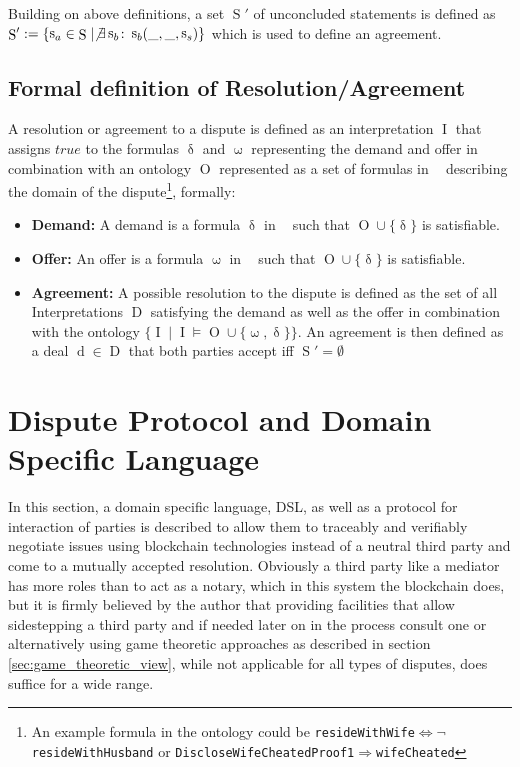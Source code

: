 \documentclass[12pt,msc,a4paper,oneside]{ucl_thesis}
\DeclareMathOperator{\Proplang}{\mathcal{L}(N)}
\DeclareMathOperator{\Interpretation}{I}
\DeclareMathOperator{\Ontology}{O}
\DeclareMathOperator{\Deal}{D}
\DeclareMathOperator{\deal}{d}
\DeclareMathOperator{\demand}{\delta}
\DeclareMathOperator{\offer}{\omega}
\DeclareMathOperator{\Statement}{S}
\DeclareMathOperator{\statement}{s}
\begin{document}
Building on above definitions, a set $\Statement'$ of unconcluded statements is defined as $\Statement' := \{\statement_a \in \Statement \mid \not\exists \statement_b \colon \statement_b(\_,\_,\statement_s)\}$ which is used to define an agreement.


\subsection{Formal definition of Resolution/Agreement}
A resolution or agreement to a dispute is defined as an interpretation $\Interpretation$ that assigns $true$ to the formulas $\demand$ and $\offer$ representing the demand and offer in combination with an ontology $\Ontology$ represented as a set of formulas in $\Proplang$ describing the domain of the dispute\footnote{An example formula in the ontology could be \texttt{resideWithWife$\Leftrightarrow\neg$resideWithHusband} or \texttt{DiscloseWifeCheatedProof1$\Rightarrow$wifeCheated}}, formally\cite{Ragone2008}:
\begin{itemize}
    \item \textbf{Demand:} A demand is a formula $\demand$ in $\Proplang$ such that $\Ontology \cup \{\demand\}$ is satisfiable.
    \item \textbf{Offer:} An offer is a formula $\offer$ in $\Proplang$ such that $\Ontology \cup \{\demand\}$ is satisfiable.
    \item \textbf{Agreement:} A possible resolution to the dispute is defined as the set of all Interpretations $\Deal$ satisfying the demand as well as the offer in combination with the ontology $\{\Interpretation \mid \Interpretation \models \Ontology \cup \{\offer, \demand\}\}$. An agreement is then defined as a deal $\deal \in \Deal$ that both parties accept iff $\Statement' = \emptyset$
\end{itemize}


\section{Dispute Protocol and Domain Specific Language}
In this section, a domain specific language, DSL, as well as a protocol for interaction of parties is described to allow them to traceably and verifiably negotiate issues using blockchain technologies instead of a neutral third party and come to a mutually accepted resolution. Obviously a third party like a mediator has more roles than to act as a notary, which in this system the blockchain does, but it is firmly believed by the author that providing facilities that allow sidestepping a third party and if needed later on in the process consult one or alternatively using game theoretic approaches as described in section \ref{sec:game_theoretic_view}, while not applicable for all types of disputes, does suffice for a wide range.
\end{document}
